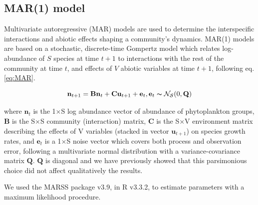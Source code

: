 \documentclass[9pt,twocolumn,twoside,lineno]{pnas-new}
\begin{document}
{\subsection*{MAR(1) model}

Multivariate autoregressive (MAR) models are used to determine the
interspecific interactions and abiotic effects shaping a community's
dynamics\cite{ives_estimating_2003}. MAR(1) models are based
on a stochastic, discrete-time Gompertz model which relates log-abundance
of $S$ species at time $t+1$ to interactions with the rest of the
community at time $t$, and effects of $V$ abiotic variables at time
$t+1$, following eq. \ref{eq:MAR}.

\begin{equation}
\mathbf{n}_{t+1}=\mathbf{B}\mathbf{n}_{t}+\textbf{C}\textbf{u}_{t+1}+\mathbf{e}_{t},\mathbf{e}_{t}\thicksim\mathcal{{N_{S}}}(0,\mathbf{Q})\label{eq:MAR}
\end{equation}

where $\mathbf{n}_{\ensuremath{t}}$ is the 1$\times$S log abundance
vector of abundance of phytoplankton groups, $\mathbf{B}$ is the
S$\times$S community (interaction) matrix, $\mathbf{C}$ is the S$\times$V
environment matrix describing the effects of V variables (stacked
in vector $\mathbf{u}_{t+1}$) on species growth rates, and $\mathbf{e}_{t}$
is a 1$\times$S noise vector which covers both process and observation
error, following a multivariate normal distribution with a variance-covariance
matrix $\mathbf{Q}$. $\mathbf{Q}$ is diagonal and we have previously
showed that this parsimonious choice did not affect qualitatively
the results\cite{barraquand_coastal_2018}.

We used the MARSS package\cite{holmes_analysis_2014} v3.9, in
R v3.3.2\cite{venables_r_2013}, to estimate parameters with
a maximum likelihood procedure.

}
\end{document}
